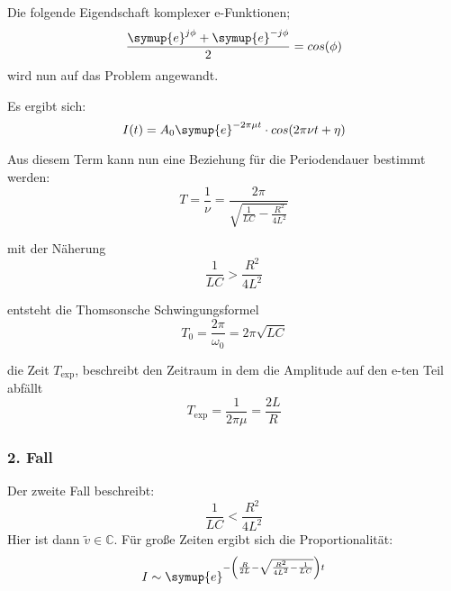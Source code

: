         Die folgende Eigendschaft komplexer e-Funktionen;
        \begin{equation}
            \frac{\symup{e}^{j \phi} + \symup{e}^{-j \phi}}{2} = cos(\phi) \nonumber
        \end{equation}
        wird nun auf das Problem angewandt.

        Es ergibt sich:
        \begin{equation}
            I(t) = A_0 \symup{e}^{- 2 \pi \mu t} \cdot cos(2\pi \nu t + \eta) \nonumber
        \end{equation}

        Aus diesem Term kann nun eine Beziehung für die Periodendauer bestimmt werden:
        \begin{equation}
            T = \frac{1}{\nu} = \frac{2 \pi}{\sqrt{\frac{1}{LC}-\frac{R^2}{4L^2}}} \nonumber
        \end{equation}

        mit der Näherung
        \begin{equation}
            \frac{1}{LC} > \frac{R^2}{4L^2} \nonumber
        \end{equation}

        entsteht die Thomsonsche Schwingungsformel
        \begin{equation}
            T_0 = \frac{2\pi}{\omega_0} = 2\pi \sqrt{LC} \nonumber
        \end{equation}

        die Zeit $T_{\text{exp}}$, beschreibt den Zeitraum in dem die Amplitude auf den e-ten Teil abfällt
        \begin{equation}
            T_{\text{exp}} = \frac{1}{2 \pi \mu } = \frac{2L}{R} \nonumber
        \end{equation}

        \subsubsection{2. Fall}

        Der zweite Fall beschreibt:
        \begin{equation}
            \frac{1}{LC} < \frac{R^2}{4L^2} \nonumber
        \end{equation}
        Hier ist dann $\tilde{v} \in \mathds{C}$.
        Für große Zeiten ergibt sich die Proportionalität:
        \begin{equation}   
            I \sim \symup{e}^{- \left( \frac{R}{2L} - \sqrt{\frac{R^2}{4L^2} - \frac{1}{LC}}\right) t} \nonumber
        \end{equation}

